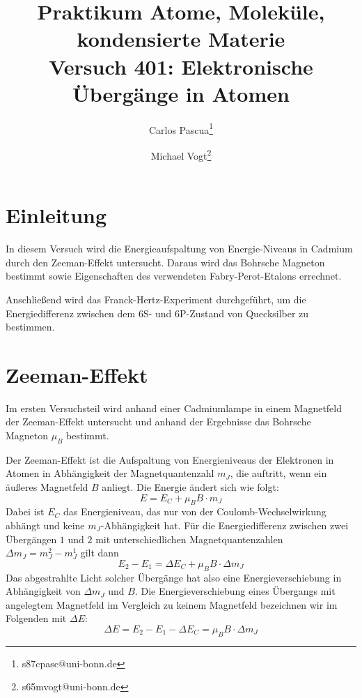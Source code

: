 \documentclass{article}
\title{Praktikum Atome, Moleküle, kondensierte Materie \\ Versuch 401: Elektronische Übergänge in Atomen}
\author[1]{Carlos Pascua\thanks{s87cpasc@uni-bonn.de}}
\author[1]{Michael Vogt\thanks{s65mvogt@uni-bonn.de}}
\affil[1]{Uni Bonn}
\begin{document}
\maketitle
\tableofcontents
\newpage
{}

\pagestyle{fancy}
\fancyhead[R]{\thepage}
\fancyhead[L]{\leftmark}

\begin{multicols}{2}

\section*{Einleitung}
In diesem Versuch wird die Energieaufspaltung von Energie-Niveaus in Cadmium durch den Zeeman-Effekt untersucht.
Daraus wird das Bohrsche Magneton bestimmt sowie Eigenschaften des verwendeten Fabry-Perot-Etalons errechnet.

Anschließend wird das Franck-Hertz-Experiment durchgeführt, um die Energiedifferenz zwischen dem 6S- und 6P-Zustand von Quecksilber zu bestimmen.


\section{Zeeman-Effekt}
Im ersten Versuchsteil wird anhand einer Cadmiumlampe in einem Magnetfeld der Zeeman-Effekt untersucht und
anhand der Ergebnisse das Bohrsche Magneton $\mu_B$ bestimmt.

Der Zeeman-Effekt ist die Aufspaltung von Energieniveaus der Elektronen in Atomen in Abhängigkeit der Magnetquantenzahl $m_J$,
die auftritt, wenn ein äußeres Magnetfeld $B$ anliegt. Die Energie ändert sich wie folgt:
\[
  E = E_C + \mu_B B \cdot m_J
\]
Dabei ist $E_C$ das Energieniveau, das nur von der Coulomb-Wechselwirkung abhängt und keine $m_J$-Abhängigkeit hat.
Für die Energiedifferenz zwischen zwei Übergängen $1$ und $2$ mit unterschiedlichen Magnetquantenzahlen $\Delta m_J = m_J^2 - m_J^1$
gilt dann
\[
  E_2 - E_1 = \Delta E_C + \mu_B B \cdot \Delta m_J
\]
Das abgestrahlte Licht solcher Übergänge hat also eine Energieverschiebung in Abhängigkeit von $\Delta m_J$ und $B$.
Die Energieverschiebung eines Übergangs mit angelegtem Magnetfeld im Vergleich zu keinem Magnetfeld bezeichnen wir im Folgenden mit $\Delta E$:
\begin{equation}
  \Delta E = E_2 - E_1 - \Delta E_C = \mu_B B \cdot \Delta m_J \label{eq:delta-e}
\end{equation}


\end{multicols}
\end{document}
